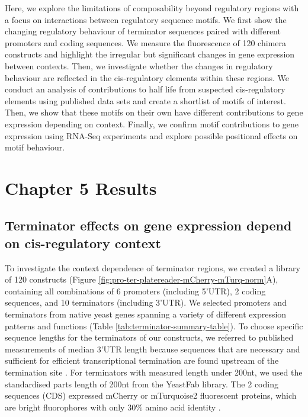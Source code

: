 \documentclass[../main.tex]{subfiles}
\begin{document}
Here, we explore the limitations of composability beyond regulatory regions with a focus on interactions between regulatory sequence motifs.
We first show the changing regulatory behaviour of terminator sequences paired with different promoters and coding sequences.
We measure the fluorescence of 120 chimera constructs and highlight the irregular but significant changes in gene expression between contexts. 
Then, we investigate whether the changes in regulatory behaviour are reflected in the cis-regulatory elements within these regions. 
We conduct an analysis of contributions to half life from suspected cis-regulatory elements using published data sets and create a shortlist of motifs of interest.
Then, we show that these motifs on their own have different contributions to gene expression depending on context. 
Finally, we confirm motif contributions to gene expression using RNA-Seq experiments and explore possible positional effects on motif behaviour. 
 
\section{Chapter 5 Results}

\subsection{Terminator effects on gene expression depend on cis-regulatory context}

To investigate the context dependence of terminator regions, we created a library of 120 constructs (Figure \ref{fig:pro-ter-platereader-mCherry-mTurq-norm}A), containing all combinations of 6 promoters (including 5'UTR), 2 coding sequences, and 10 terminators (including 3'UTR).
We selected promoters and terminators from native yeast genes spanning a variety of different expression patterns and functions (Table \ref{tab:terminator-summary-table}).
To choose specific sequence lengths for the terminators of our constructs, we referred to published measurements of median 3'UTR length \parencite{Pelechano2013} because sequences that are necessary and sufficient for efficient transcriptional termination are found upstream of the termination site \parencite{Guo1996}.
For terminators with measured length under 200nt, we used the standardised parts length of 200nt from the YeastFab library.
The 2 coding sequences (CDS) expressed mCherry or mTurquoise2 fluorescent proteins, which are bright fluorophores with only 30\% amino acid identity \parencite{Shaner2004, Goedhart2012}.
\end{document}
